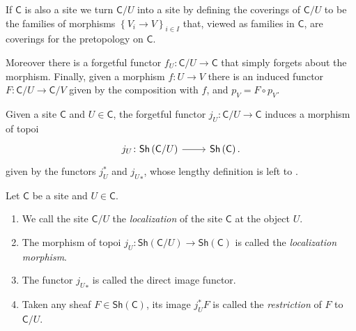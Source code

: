 \begin{rem}[]
	If $\mathsf{C}$ is also a site we turn $\mathsf{C}/U$ into a site
	by defining the coverings of $\mathsf{C}/U$ to be the families
	of morphisms $\left\{ V_{ i } \to V \right\}_{ i \in I }$
	that, viewed as families in $\mathsf{C}$, are coverings for the
	pretopology on $\mathsf{C}$.

	Moreover there is a forgetful functor $f_U\colon \mathsf{C}/U \to \mathsf{C}$
	that simply forgets about the morphism.
	Finally, given a morphism $f\colon U \to V$ there is an induced
	functor $F\colon \mathsf{C}/U \to \mathsf{C}/V$ given
	by the composition with $f$, and $p_V = F \circ p_V$.
\end{rem}


\begin{lem}
	Given a site $\mathsf{C}$ and $U \in \mathsf{C}$, the forgetful functor
	$j_U\colon \mathsf{C}/U \to \mathsf{C}$ induces a
	morphism of topoi
	\begin{equation*}
	\begin{tikzcd}[row sep = 0ex
		,/tikz/column 1/.append style={anchor=base east}
		,/tikz/column 2/.append style={anchor=base west}]
		j_U\colon 
		\mathsf{Sh}\left(\mathsf{C}/U\right)\arrow[r, "", rightarrow] &
		\mathsf{Sh}\left(\mathsf{C}\right)
	.\end{tikzcd}
	\end{equation*} 
	given by the functors $j_U^*$ and ${j_U}_*$, whose lengthy definition
	is left to \cite[\href{https://stacks.math.columbia.edu/tag/00UZ}{Chapter 00UZ}]{SP}.
\end{lem} 


\begin{defn}[Localization]\label{defn:localizationTopoi}
	Let $\mathsf{C}$ be a site and $U \in \mathsf{C}$.
\begin{enumerate}
	\item We call the site $\mathsf{C}/U$ the \emph{localization}
		of the site $\mathsf{C}$ at the object $U$.
	\item The morphism of topoi 
		$j_U\colon \mathsf{Sh}\left(\mathsf{C}/U\right) \to \mathsf{Sh}\left(\mathsf{C}\right)$
		is called the \emph{localization morphism}.
	\item The functor ${j_U}_*$ is called the direct image functor.
	\item Taken any sheaf $F \in \mathsf{Sh}\left(\mathsf{C}\right)$,
		its image $j_U^*F$ is called the \emph{restriction} of $F$ to $\mathsf{C}/U$.
\end{enumerate}
\end{defn}


